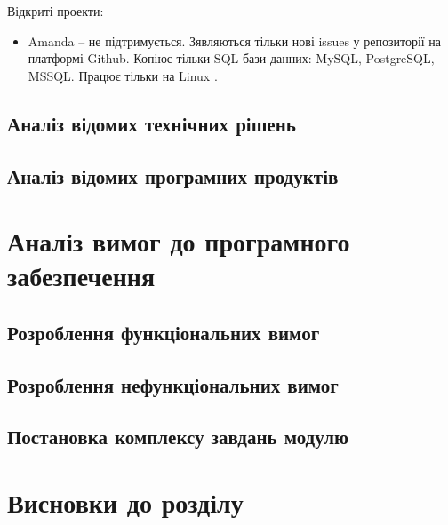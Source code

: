 Відкриті проекти:
\begin{itemize}
    \item Amanda -- не підтримується. Зявляються тільки нові issues у репозиторії на платформі Github.
    Копіює тільки SQL бази данних: MySQL, PostgreSQL, MSSQL. Працює тільки на Linux \cite{conqualitynoc}.
\end{itemize}

\subsection{Аналіз відомих технічних рішень}

\subsection{Аналіз відомих програмних продуктів}

\section{Аналіз вимог до програмного забезпечення}
\subsection{Розроблення функціональних вимог}
\subsection{Розроблення нефункціональних вимог}
\subsection{Постановка комплексу завдань модулю}

\section{Висновки до розділу}





